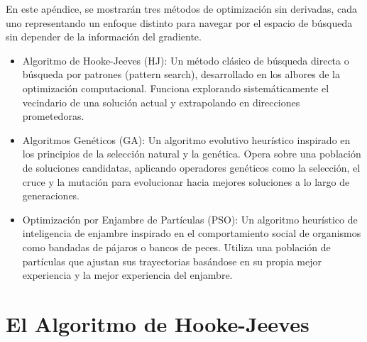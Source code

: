 En este apéndice, se mostrarán tres métodos de optimización sin derivadas, cada uno representando un enfoque distinto para navegar por el espacio de búsqueda sin depender de la información del gradiente.
\begin{itemize}
    \item Algoritmo de Hooke-Jeeves (HJ): Un método clásico de búsqueda directa o búsqueda por patrones (pattern search), desarrollado en los albores de la optimización computacional. Funciona explorando sistemáticamente el vecindario de una solución actual y extrapolando en direcciones prometedoras.
    \item Algoritmos Genéticos (GA): Un algoritmo evolutivo heurístico inspirado en los principios de la selección natural y la genética. Opera sobre una población de soluciones candidatas, aplicando operadores genéticos como la selección, el cruce y la mutación para evolucionar hacia mejores soluciones a lo largo de generaciones.
    \item Optimización por Enjambre de Partículas (PSO): Un algoritmo heurístico de inteligencia de enjambre inspirado en el comportamiento social de organismos como bandadas de pájaros o bancos de peces. Utiliza una población de partículas que ajustan sus trayectorias basándose en su propia mejor experiencia y la mejor experiencia del enjambre.
\end{itemize}

\section{El Algoritmo de Hooke-Jeeves}

